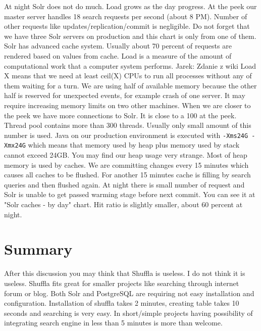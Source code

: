 \documentclass[10pt,a4paper]{article}
\newcommand{\jarek}[1]{\noindent\colorbox{myYellow}{Jarek: #1}}
\begin{document}
At night Solr does not do much. Load grows as the day progress. At the peek our master server handles 18 search requests per second (about 8 PM). Number of other requests like updates/replication/commit is negligible. Do not forget that we have three Solr servers on production and this chart is only from one of them. Solr has advanced cache system. Usually about 70 percent of requests are rendered based on values from cache. Load is a measure of the amount of computational work that a computer system performs. \jarek{Zdanie z wiki} Load X means that we need at least ceil(X) CPUs to run all processes without any of them waiting for a turn.  We are using half of available memory because the other half is reserved for unexpected events, for example crash of one server. It may require increasing memory limits on two other machines. When we are closer to the peek we have more connections to Solr. It is close to a 100 at the peek. Thread pool contains more than 300 threads. Usually only small amount of this number is used. Java on our production environment is executed with \verb|-Xms24G -Xmx24G| which means that memory used by heap plus memory used by stack cannot exceed 24GB. You may find our heap usage very strange. Most of heap memory is used by caches. We are committing changes every 15 minutes which causes all caches to be flushed. For another 15 minutes cache is filling by search queries and then flushed again. At night there is small number of request and Solr is unable to get passed warming stage before next commit. You can see it at "Solr caches - by day" chart. Hit ratio is slightly smaller, about 60 percent at night.

\section{Summary}

After this discussion you may think that Shuffla is useless. I do not think it is useless. Shuffla fits great for smaller projects like searching through internet forum or blog. Both Solr and PostgreSQL are requiring not easy installation and configuration. Installation of shuffla takes 2 minutes, creating table takes 10 seconds and searching is very easy. In short/simple projects having possibility of integrating search engine in less than 5 minutes is more than welcome.




\end{document}
